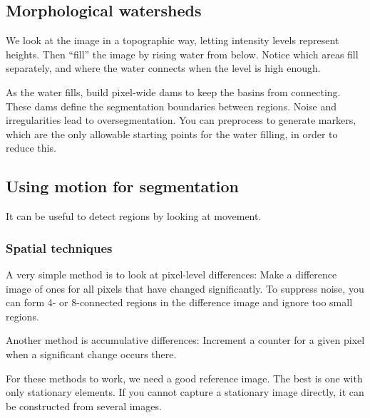 \subsection{Morphological watersheds}
We look at the image in a topographic way, letting intensity levels represent heights. Then ``fill'' the image by rising water from below. Notice which areas fill separately, and where the water connects when the level is high enough.

As the water fills, build pixel-wide dams to keep the basins from connecting. These dams define the segmentation boundaries between regions. Noise and irregularities lead to oversegmentation. You can preprocess to generate markers, which are the only allowable starting points for the water filling, in order to reduce this.

\subsection{Using motion for segmentation}
It can be useful to detect regions by looking at movement.

\subsubsection{Spatial techniques}
A very simple method is to look at pixel-level differences: Make a difference image of ones for all pixels that have changed significantly. To suppress noise, you can form 4- or 8-connected regions in the difference image and ignore too small regions.

Another method is accumulative differences: Increment a counter for a given pixel when a significant change occurs there.

For these methods to work, we need a good reference image. The best is one with only stationary elements. If you cannot capture a stationary image directly, it can be constructed from several images.
